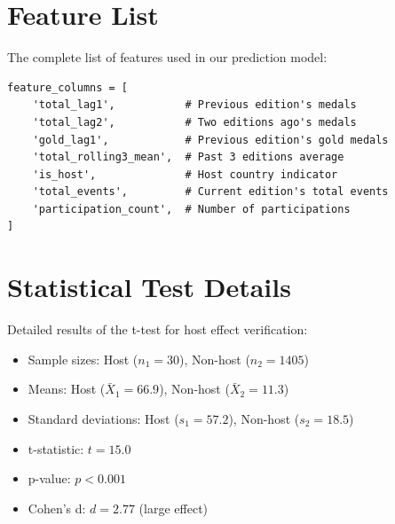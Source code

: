 \documentclass{mcmthesis}
\begin{document}
\begin{appendices}

\section{Feature List}

The complete list of features used in our prediction model:

\begin{verbatim}
feature_columns = [
    'total_lag1',           # Previous edition's medals
    'total_lag2',           # Two editions ago's medals
    'gold_lag1',            # Previous edition's gold medals
    'total_rolling3_mean',  # Past 3 editions average
    'is_host',              # Host country indicator
    'total_events',         # Current edition's total events
    'participation_count',  # Number of participations
]
\end{verbatim}

\section{Statistical Test Details}

Detailed results of the t-test for host effect verification:
\begin{itemize}
    \item Sample sizes: Host ($n_1 = 30$), Non-host ($n_2 = 1405$)
    \item Means: Host ($\bar{X}_1 = 66.9$), Non-host ($\bar{X}_2 = 11.3$)
    \item Standard deviations: Host ($s_1 = 57.2$), Non-host ($s_2 = 18.5$)
    \item t-statistic: $t = 15.0$
    \item p-value: $p < 0.001$
    \item Cohen's d: $d = 2.77$ (large effect)
\end{itemize}

\end{appendices}
\end{document}
